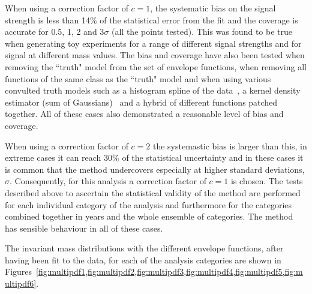 When using a correction factor of $c=1$, the systematic bias on the signal strength is less than 14\% of the statistical error from the fit and the coverage is accurate for 0.5, 1, 2 and 3$\sigma$ (all the points tested). This was found to be true when generating toy experiments for a range of different signal strengths and for signal at different mass values. The bias and coverage have also been tested when removing the ``truth" model from the set of envelope functions, when removing all functions of the same class as the ``truth" model and when using various convulted truth models such as a histogram spline of the data~\cite{regression_spline}, a kernel density estimator (sum of Gaussians)~\cite{kde} and a hybrid of different functions patched together. All of these cases also demonstrated a reasonable level of bias and coverage. 

When using a correction factor of $c=2$ the systemastic bias is larger than this, in extreme cases it can reach 30\% of the statistical uncertainty and in these cases it is common that the method undercovers especially at higher standard deviations, $\sigma$. Consequently, for this analysis a correction factor of $c=1$ is chosen. The tests described above to ascertain the statistical validity of the method are performed for each individual category of the analysis and furthermore for the categories combined together in years and the whole ensemble of categories. The method has sensible behaviour in all of these cases.

The invariant mass distributions with the different envelope functions, after having been fit to the data, for each of the analysis categories are shown in Figures~\cref{fig:multipdf1,fig:multipdf2,fig:multipdf3,fig:multipdf4,fig:multipdf5,fig:multipdf6}.

